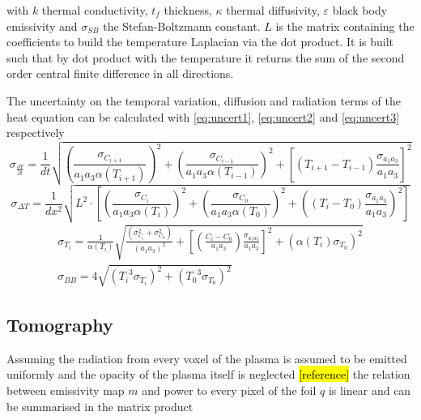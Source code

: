 with $k$ thermal conductivity, $t_f$  thickness, $\kappa$ thermal diffusivity, $\varepsilon$ black body emissivity and $\sigma_{SB}$ the Stefan-Boltzmann constant. $L$ is the matrix containing the coefficients to build the temperature Laplacian via the dot product. It is built such that by dot product with the temperature it returns the sum of the second order central finite difference in all directions.

The uncertainty on the temporal variation, diffusion and radiation terms of the heat equation can be calculated with \autoref{eq:uncert1}, \ref{eq:uncert2} and \ref{eq:uncert3} respectively
\begin{equation}
{\sigma }_{ \frac {\partial T} {\partial t}} = \frac 1 {dt}  \sqrt{ \left ( \frac {{\sigma }_{C_{i+1}}} { a_1 a_3 \alpha(T_{i+1}) } \right )^2 + \left ( \frac {{\sigma }_{C_{i-1}}} { a_1 a_3 \alpha(T_{i-1}) } \right )^2 + \left [ \left ( T_{i+1}-T_{i-1} \right ) \frac {{\sigma }_{a_1 a_3}} {a_1 a_3} \right ]^2 } 
\label{eq:uncert1}
\end{equation}
\begin{equation}
{\sigma }_{ \Delta T} = \frac {1} {dx^2} \sqrt{ L^2 \cdot \left[  \left(  \frac {{\sigma }_{C_i}} { a_1 a_3 \alpha(T_i) } \right)^2 + \left( \frac {{\sigma }_{C_0}} { a_1 a_3 \alpha(T_0) } \right)^2 + \left( ({T_i -T_0}) \frac {{\sigma }_{a_1 a_3}} {a_1 a_3} \right)^2 \right] } 
\label{eq:uncert2}
\end{equation}\begin{equation}
\begin{split}
{\sigma }_{T_i} = \frac 1 {\alpha(T_i)} \sqrt{ \frac {({\sigma }_{C_i}^2 + {\sigma }_{C_0}^2 )} { (a_1 a_3)^2 } + \left [ \left (\frac {C_i -C_0} {a_1 a_3} \right ) \frac {{\sigma }_{a_1 a_3}} {a_1 a_3} \right ]^2  + (\alpha(T_i) {\sigma }_{T_0})^2 } \\ {\sigma }_{ BB} = 4 \sqrt{ ({T_i}^3 {\sigma }_{T_i})^2 + ({T_0}^3 {\sigma }_{T_0})^2 }
\label{eq:uncert3}
\end{split}
\end{equation}


\subsection{Tomography}
Assuming the radiation from every voxel of the plasma is assumed to be emitted uniformly and the opacity of the plasma itself is neglected \hl{[reference]} the relation between emissivity map $m$ and power to every pixel of the foil $q$ is linear and can be summarised in the matrix product

